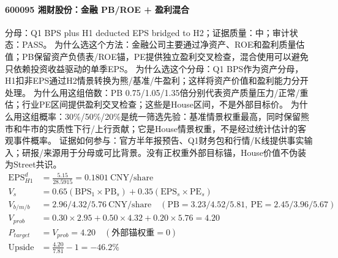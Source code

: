 \paragraph{600095 湘财股份：金融 PB/ROE + 盈利混合}
分母：Q1 BPS plus H1 deducted EPS bridged to H2；证据质量：中；审计状态：PASS。
为什么选这个方法：金融公司主要通过净资产、ROE和盈利质量估值；PB保留资产负债表/ROE锚，PE提供独立盈利交叉检查，混合使用可以避免只依赖投资收益驱动的单季EPS。
为什么选这个分母：Q1 BPS作为资产分母，H1扣非EPS通过H2情景转换为熊/基准/牛盈利；这样将资产价值和盈利能力分开处理。
为什么用这组倍数：PB 0.75/1.05/1.35倍分别代表资产质量压力/正常/重估；行业PE区间提供盈利交叉检查；这些是House区间，不是外部目标价。
为什么用这组概率：30\%/50\%/20\%是统一筛选先验：基准情景权重最高，同时保留熊市和牛市的实质性下行/上行贡献；它是House情景权重，不是经过统计估计的客观事件概率。
证据如何参与：官方半年报预告、Q1财务包和行情/K线提供事实输入；研报/来源用于分母或可比背景。没有正权重外部目标锚，House价值不伪装为Street共识。
\begin{align*}
\mathrm{EPS}_{H1}^d &= \frac{5.15}{28.5915} = 0.1801\ \mathrm{CNY/share}\\
V_s &= 0.65\left(\mathrm{BPS}_1\times \mathrm{PB}_s\right)+0.35\left(\mathrm{EPS}_s\times \mathrm{PE}_s\right)\\
V_{b/m/b} &= 2.96/4.32/5.76\ \mathrm{CNY/share}\quad(\mathrm{PB}=3.23/4.52/5.81,\ \mathrm{PE}=2.45/3.96/5.67)\\
V_{prob} &= 0.30\times 2.95+0.50\times 4.32+0.20\times 5.76=4.20\\
P_{target} &= V_{prob}=4.20\quad(\text{外部锚权重}=0)\\
\mathrm{Upside} &= \frac{4.20}{7.81}-1=-46.2\%\\
\end{align*}

